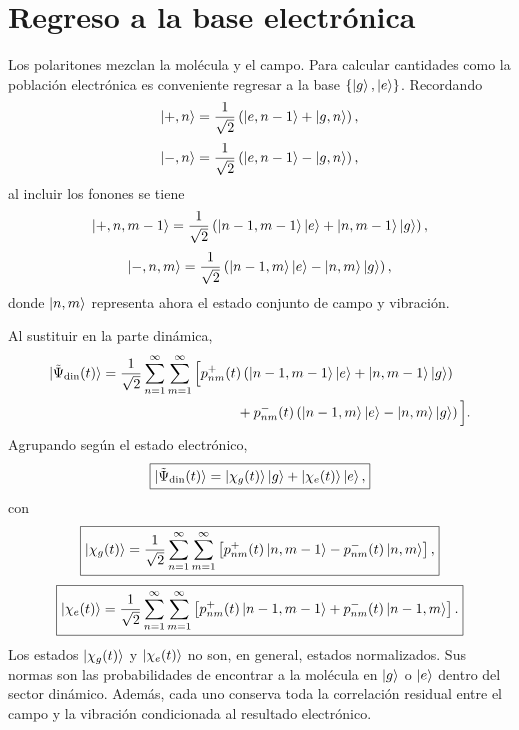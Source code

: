 \documentclass[11pt]{article}
\begin{document}
\section{Regreso a la base electr\'onica}

Los polaritones mezclan la mol\'ecula y el campo. Para calcular cantidades como
la poblaci\'on electr\'onica es conveniente regresar a la base
$\{\ket g,\ket e\}$. Recordando
\begin{equation}
  \ket{+,n}
  =
  \frac{1}{\sqrt2}
  \left(
  \ket{e,n-1}+\ket{g,n}
  \right),
\end{equation}
\begin{equation}
  \ket{-,n}
  =
  \frac{1}{\sqrt2}
  \left(
  \ket{e,n-1}-\ket{g,n}
  \right),
\end{equation}
al incluir los fonones se tiene
\begin{equation}
  \ket{+,n,m-1}
  =
  \frac{1}{\sqrt2}
  \left(
  \ket{n-1,m-1}\ket e
  +
  \ket{n,m-1}\ket g
  \right),
\end{equation}
\begin{equation}
  \ket{-,n,m}
  =
  \frac{1}{\sqrt2}
  \left(
  \ket{n-1,m}\ket e
  -
  \ket{n,m}\ket g
  \right),
\end{equation}
donde $\ket{n,m}$ representa ahora el estado conjunto de campo y vibraci\'on.

Al sustituir en la parte din\'amica,
\begin{align}
  \ket{\tilde\Psi_{\mathrm{din}}(t)}
  &=
  \frac{1}{\sqrt2}
  \sum_{n=1}^{\infty}\sum_{m=1}^{\infty}
  \Big[
  p_{nm}^{+}(t)
  \left(
  \ket{n-1,m-1}\ket e+\ket{n,m-1}\ket g
  \right)
  \notag\\
  &\hspace{3.4cm}+
  p_{nm}^{-}(t)
  \left(
  \ket{n-1,m}\ket e-\ket{n,m}\ket g
  \right)
  \Big].
\end{align}
Agrupando seg\'un el estado electr\'onico,
\begin{equation}
  \boxed{
  \ket{\tilde\Psi_{\mathrm{din}}(t)}
  =
  \ket{\chi_g(t)}\ket g
  +
  \ket{\chi_e(t)}\ket e,
  }
\end{equation}
con
\begin{equation}
  \boxed{
  \ket{\chi_g(t)}
  =
  \frac{1}{\sqrt2}
  \sum_{n=1}^{\infty}\sum_{m=1}^{\infty}
  \left[
  p_{nm}^{+}(t)\ket{n,m-1}
  -
  p_{nm}^{-}(t)\ket{n,m}
  \right],
  }
\end{equation}
\begin{equation}
  \boxed{
  \ket{\chi_e(t)}
  =
  \frac{1}{\sqrt2}
  \sum_{n=1}^{\infty}\sum_{m=1}^{\infty}
  \left[
  p_{nm}^{+}(t)\ket{n-1,m-1}
  +
  p_{nm}^{-}(t)\ket{n-1,m}
  \right].
  }
\end{equation}
Los estados $\ket{\chi_g(t)}$ y $\ket{\chi_e(t)}$ no son, en general,
estados normalizados. Sus normas son las probabilidades de encontrar a la
mol\'ecula en $\ket g$ o $\ket e$ dentro del sector din\'amico. Adem\'as,
cada uno conserva toda la correlaci\'on residual entre el campo y la
vibraci\'on condicionada al resultado electr\'onico.
\end{document}
